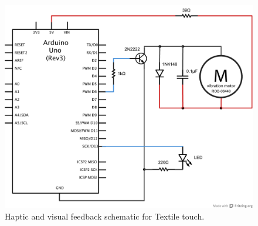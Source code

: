 \begin{figure}[h]
	\centering
  		\includegraphics[width=\textwidth]{figures/schematics/textile-touch-feedback.pdf}
	\caption{Haptic and visual feedback schematic for Textile touch.}
\end{figure}
